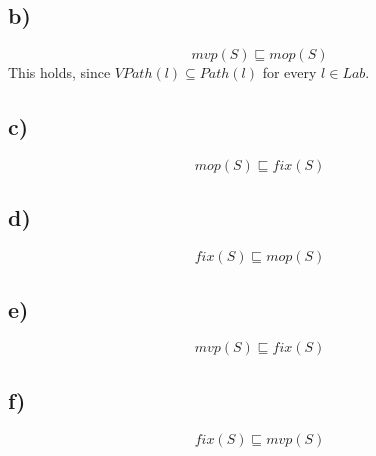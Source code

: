 \documentclass[fleqn,12pt]{article}
\begin{document}
\subsection*{b)}
$$mvp(S) \sqsubseteq mop(S)$$
This holds, since $VPath(l) \subseteq Path(l)$ for every $l \in Lab$.
\subsection*{c)}
$$mop(S) \sqsubseteq fix(S)$$
\subsection*{d)}
$$fix(S) \sqsubseteq mop(S)$$
\subsection*{e)}
$$mvp(S) \sqsubseteq fix(S)$$
\subsection*{f)}
$$fix(S) \sqsubseteq mvp(S)$$
\end{document}
